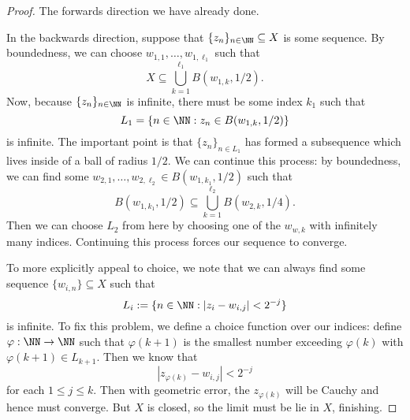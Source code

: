 \begin{proof}
	The forwards direction we have already done.

	In the backwards direction, suppose that $\{z_n\}_{n\in\NN}\subseteq X$ is some sequence. By boundedness, we can choose $w_{1,1},\ldots,w_{1,\ell_1}$ such that
	\[X\subseteq\bigcup_{k=1}^{\ell_1}B(w_{1,k},1/2).\]
	Now, because $\{z_n\}_{n\in\NN}$ is infinite, there must be some index $k_1$ such that
	\[L_1=\{n\in\NN:z_n\in B(w_{1,k},1/2)\}\]
	is infinite. The important point is that $\{z_n\}_{n\in L_1}$ has formed a subsequence which lives inside of a ball of radius $1/2$. We can continue this process: by boundedness, we can find some $w_{2,1},\ldots,w_{2,\ell_2}\in B(w_{1,k_1},1/2)$ such that
	\[B(w_{1,k_1},1/2)\subseteq\bigcup_{k=1}^{\ell_2}B(w_{2,k},1/4).\]
	Then we can choose $L_2$ from here by choosing one of the $w_{w,k}$ with infinitely many indices. Continuing this process forces our sequence to converge.

	To more explicitly appeal to choice, we note that we can always find some sequence $\{w_{i,n}\}\subseteq X$ such that
	\[L_i:=\{n\in\NN:|z_i-w_{i,j}|<2^{-j}\}\]
	is infinite. To fix this problem, we define a choice function over our indices: define $\varphi:\NN\to\NN$ such that $\varphi(k+1)$ is the smallest number exceeding $\varphi(k)$ with $\varphi(k+1)\in L_{k+1}$. Then we know that
	\[|z_{\varphi(k)}-w_{i,j}|<2^{-j}\]
	for each $1\le j\le k$. Then with geometric error, the $z_{\varphi(k)}$ will be Cauchy and hence must converge. But $X$ is closed, so the limit must be lie in $X$, finishing.
\end{proof}